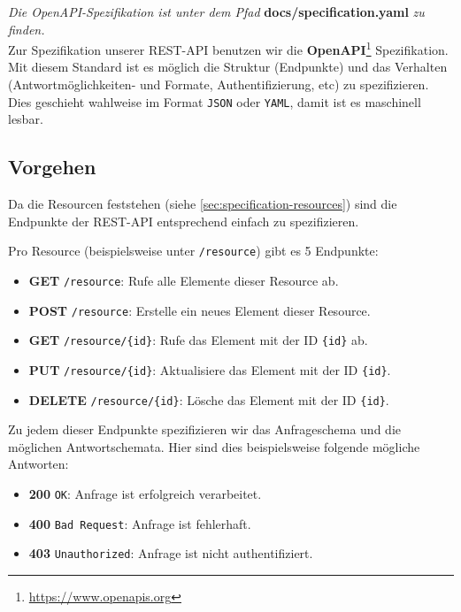 \textit{Die OpenAPI-Spezifikation ist unter dem Pfad} \textbf{docs/specification.yaml} \textit{zu finden.}\\

Zur Spezifikation unserer REST-API benutzen wir die \textbf{OpenAPI}\footnote{\url{https://www.openapis.org}} Spezifikation.
Mit diesem Standard ist es möglich die Struktur (Endpunkte) und das Verhalten (Antwortmöglichkeiten- und Formate, Authentifizierung, etc) zu spezifizieren.
Dies geschieht wahlweise im Format \texttt{JSON} oder \texttt{YAML}, damit ist es maschinell lesbar.

\subsection{Vorgehen}

Da die Resourcen feststehen (siehe \ref{sec:specification-resources}) sind die Endpunkte der REST-API entsprechend einfach zu spezifizieren. 

Pro Resource (beispielsweise unter \texttt{/resource}) gibt es 5 Endpunkte:
\begin{itemize}
    \item \textbf{GET} \texttt{/resource}: Rufe alle Elemente dieser Resource ab.
    \item \textbf{POST} \texttt{/resource}: Erstelle ein neues Element dieser Resource.
    \item \textbf{GET} \texttt{/resource/\{id\}}: Rufe das Element mit der ID \texttt{\{id\}} ab.
    \item \textbf{PUT} \texttt{/resource/\{id\}}: Aktualisiere das Element mit der ID \texttt{\{id\}}.
    \item \textbf{DELETE} \texttt{/resource/\{id\}}: Lösche das Element mit der ID \texttt{\{id\}}.
\end{itemize}

Zu jedem dieser Endpunkte spezifizieren wir das Anfrageschema und die möglichen Antwortschemata. Hier sind dies beispielsweise folgende mögliche Antworten:

\begin{itemize}
    \item \textbf{200} \texttt{OK}: Anfrage ist erfolgreich verarbeitet.
    \item \textbf{400} \texttt{Bad Request}: Anfrage ist fehlerhaft.
    \item \textbf{403} \texttt{Unauthorized}: Anfrage ist nicht authentifiziert.
\end{itemize}

